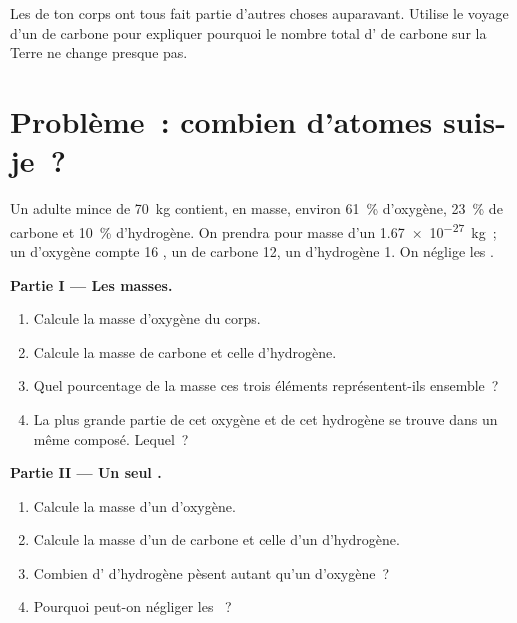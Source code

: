 \begin{exercise}[$\star\star\star$]\label{exo:g9:elements-universe-earth:12}
Les  de ton corps ont tous fait partie d'autres choses auparavant.
Utilise le voyage d'un  de carbone pour expliquer pourquoi le
nombre total d' de carbone sur la Terre ne change presque pas.
\end{exercise}

\section{Problème~: combien d'atomes suis-je~?}

\begin{problem}
\label{pb:g9:elements-universe-earth:1}
Un adulte mince de \qty{70}{kg} contient, en masse, environ
\qty{61}{\percent} d'oxygène, \qty{23}{\percent} de carbone et
\qty{10}{\percent} d'hydrogène. On prendra pour masse d'un 
\qty{1.67e-27}{kg}~; un  d'oxygène compte 16 , un  de
carbone 12, un  d'hydrogène 1. On néglige les .

\medskip
\noindent\textbf{Partie I --- Les masses.}
\begin{enumerate}
  \item Calcule la masse d'oxygène du corps.
  \item Calcule la masse de carbone et celle d'hydrogène.
  \item Quel pourcentage de la masse ces trois éléments représentent-ils
        ensemble~?
  \item La plus grande partie de cet oxygène et de cet hydrogène se
        trouve dans un même composé. Lequel~?
\end{enumerate}

\medskip
\noindent\textbf{Partie II --- Un seul .}
\begin{enumerate}[resume]
  \item Calcule la masse d'un  d'oxygène.
  \item Calcule la masse d'un  de carbone et celle d'un 
        d'hydrogène.
  \item Combien d' d'hydrogène pèsent autant qu'un 
        d'oxygène~?
  \item Pourquoi peut-on négliger les ~?
\end{enumerate}


\end{problem}
